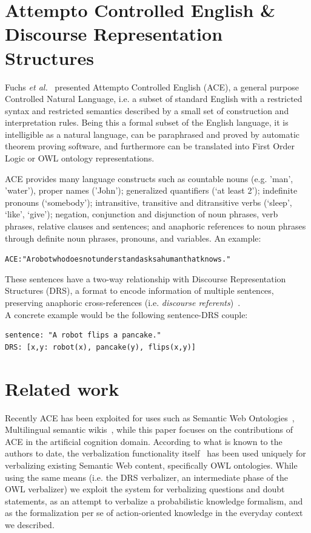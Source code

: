 \documentclass[oribibl]{llncs}
\begin{document}
\section{Attempto Controlled English \& Discourse Representation Structures}

Fuchs \textit{et al.}~\cite{fuchs:flairs2006} presented Attempto Controlled English (ACE), a general purpose Controlled Natural Language, i.e. a subset of standard English with a restricted syntax and restricted semantics described by a small set of construction and interpretation rules.
Being this a formal subset of the English language, it is intelligible as a natural language, can be paraphrased and proved by automatic theorem proving software, and furthermore can be translated into First Order Logic or OWL ontology representations.

ACE provides many language constructs such as countable nouns (e.g. 'man', 'water'), proper names ('John'); 
generalized quantifiers (‘at least 2’); indefinite pronouns (‘somebody’); intransitive, transitive and ditransitive verbs (‘sleep’, ‘like’, ‘give’); negation, conjunction and disjunction of noun phrases, verb phrases, relative clauses and sentences; and anaphoric references to noun phrases through definite noun phrases, pronouns, and variables.
An example: \begin{alltt}{\color{red} ACE:} "A robot who does not understand asks a human that knows."\end{alltt}

These sentences have a two-way relationship with Discourse Representation Structures (DRS), a format to encode information of multiple sentences, preserving anaphoric cross-references (i.e. \textit{discourse referents})~\cite{kamp1993discourse}.\\
A concrete example would be the following sentence-DRS couple: 
\begin{verbatim}
sentence: "A robot flips a pancake."
DRS: [x,y: robot(x), pancake(y), flips(x,y)]
\end{verbatim}

\section{Related work}
Recently ACE has been exploited for uses such as Semantic Web Ontologies~\cite{decoi2009rewerse}, Multilingual semantic wikis~\cite{kuhnkaljurandsemantic}, while this paper focuses on the contributions of ACE in the artificial cognition domain.
According to what is known to the authors to date, the verbalization functionality itself~\cite{kaljurand:phd} has been used uniquely for verbalizing existing Semantic Web content, specifically OWL ontologies.
While using the same means (i.e. the DRS verbalizer, an intermediate phase of the OWL verbalizer) we exploit the system for verbalizing questions and doubt statements, as an attempt to verbalize a probabilistic knowledge formalism, and as the formalization per se of action-oriented knowledge in the everyday context we described.
\end{document}
